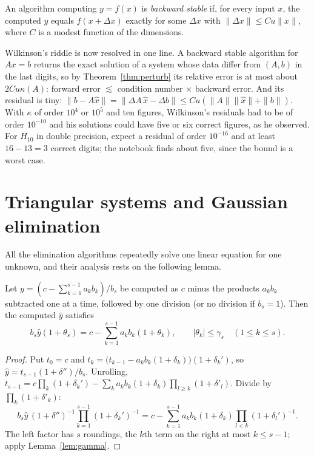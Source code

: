 \begin{definition}\label{def:backward}
An algorithm computing $y=f(x)$ is \emph{backward stable} if, for every input $x$, the computed $\hat y$ equals $f(x+\Delta x)$ exactly for some
$\Delta x$ with $\|\Delta x\|\le Cu\|x\|$, where $C$ is a modest function of the dimensions.
\end{definition}

Wilkinson's riddle is now resolved in one line. A backward stable algorithm for $Ax=b$ returns the exact solution of a system whose data differ from
$(A,b)$ in the last digits, so by Theorem~\ref{thm:perturb} its relative error is at most about $2Cu\kappa(A)$: forward error $\lesssim$ condition number
$\times$ backward error. And its residual is tiny: $\|b-A\hat x\|=\|\Delta A\,\hat x-\Delta b\|\le Cu(\|A\|\|\hat x\|+\|b\|)$. With $\kappa$ of order $10^4$ or $10^5$ and
ten figures, Wilkinson's residuals had to be of order $10^{-10}$ and his solutions could have five or six correct figures, as he observed. For $H_{10}$
in double precision, expect a residual of order $10^{-16}$ and at least $16-13=3$ correct digits; the notebook finds about five, since the bound is a worst case.

\section{Triangular systems and Gaussian elimination}\label{sec:ge}

All the elimination algorithms repeatedly solve one linear equation for one unknown, and their analysis rests on the following lemma.

\begin{lemma}\label{lem:oneeq}
Let $y=(c-\sum_{k=1}^{s-1}a_kb_k)/b_s$ be computed as $c$ minus the products $a_kb_k$ subtracted one at a time, followed by one division (or no
division if $b_s=1$). Then the computed $\hat y$ satisfies
\[
b_s\hat y(1+\theta_s)=c-\sum_{k=1}^{s-1}a_kb_k(1+\theta_k),\qquad|\theta_k|\le\gamma_s\quad(1\le k\le s).
\]
\end{lemma}
\begin{proof}
Put $t_0=c$ and $t_k=\bigl(t_{k-1}-a_kb_k(1+\delta_k)\bigr)(1+\delta_k')$, so $\hat y=t_{s-1}(1+\delta'')/b_s$. Unrolling,
$t_{s-1}=c\prod_{k}(1+\delta_k')-\sum_ka_kb_k(1+\delta_k)\prod_{l\ge k}(1+\delta'_l)$. Divide by $\prod_k(1+\delta'_k)$:
\[
b_s\hat y\,(1+\delta'')^{-1}\prod_{k=1}^{s-1}(1+\delta_k')^{-1}=c-\sum_{k=1}^{s-1}a_kb_k(1+\delta_k)\prod_{l<k}(1+\delta_l')^{-1}.
\]
The left factor has $s$ roundings, the $k$th term on the right at most $k\le s-1$; apply Lemma~\ref{lem:gamma}.
\end{proof}

